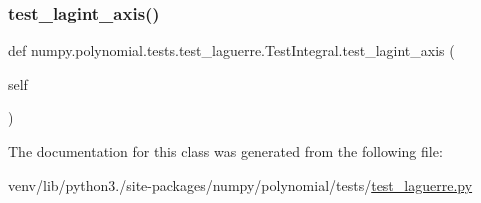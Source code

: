 \mbox{\label{classnumpy_1_1polynomial_1_1tests_1_1test__laguerre_1_1TestIntegral_aee31c460968b8de8673d068e06a3c226}} 
\subsubsection{\texorpdfstring{test\+\_\+lagint\+\_\+axis()}{test\_lagint\_axis()}}
{\footnotesize\ttfamily def numpy.\+polynomial.\+tests.\+test\+\_\+laguerre.\+Test\+Integral.\+test\+\_\+lagint\+\_\+axis (\begin{DoxyParamCaption}\item[{}]{self }\end{DoxyParamCaption})}



The documentation for this class was generated from the following file\+:\begin{DoxyCompactItemize}
\item 
venv/lib/python3./site-\/packages/numpy/polynomial/tests/\hyperlink{test__laguerre_8py}{test\+\_\+laguerre.\+py}\end{DoxyCompactItemize}
